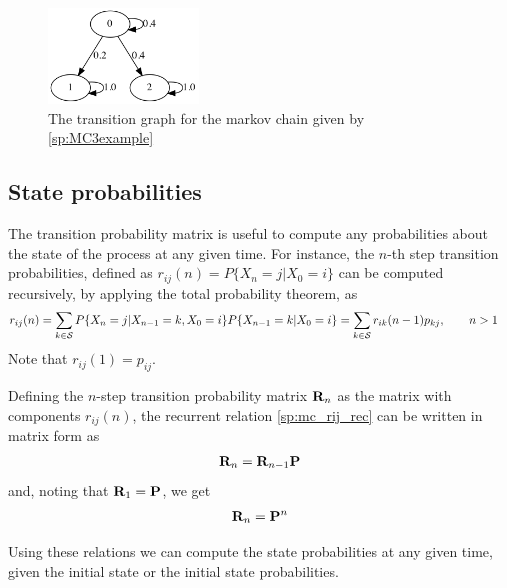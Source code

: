 \begin{figure}[htb]
  \begin{center}
    \includegraphics[width=4cm]{Figures/MC0_markov_chan_graph.png} 
    \caption{The transition graph for the markov chain given by \eqref{sp:MC3example}}
    \label{fig:sp_mc}
  \end{center}
\end{figure}

\subsection{State probabilities}

The transition probability matrix is useful to compute any probabilities about the state of the process at any given time. For instance, the $n$-th step transition probabilities, defined as $r_{ij}(n) = P\{X_n = j | X_0 = i\}$ can be computed recursively, by applying the total probability theorem, as
\begin{align}
r_{ij}(n) 
	&= \sum_{k \in {\cal S}} P\{X_n = j | X_{n-1} = k,  X_0 = i\} P\{X_{n-1} = k | X_0 = i\}  
	 = \sum_{k \in {\cal S}} r_{ik}(n-1) p_{kj},  \qquad n > 1 
\label{sp:mc_rij_rec}	
\end{align}
Note that $r_{ij}(1)= p_{ij}$. 

Defining the $n$-step transition probability  matrix ${\bf R}_n$ as the matrix with components $r_{ij}(n)$, the recurrent relation \eqref{sp:mc_rij_rec} can be written in matrix form as
\begin{align}
{\bf R}_n = {\bf R}_{n-1}{\bf P}
\end{align}
and, noting that ${\bf R}_1={\bf P}$, we get
\begin{align}
{\bf R}_n = {\bf P}^n
\label{sp:mc_Rn_rec}	
\end{align}

Using these relations we can compute the state probabilities at any given time, given the initial state or the initial state probabilities.

